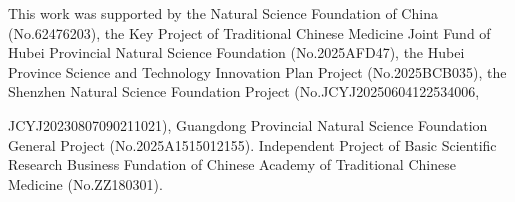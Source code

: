 \documentclass[journal,twoside,web]{ieeecolor}
\begin{document}
This work was supported by 
the Natural Science Foundation of China (No.62476203), 
the Key Project of Traditional Chinese Medicine Joint Fund of Hubei Provincial Natural Science Foundation (No.2025AFD47), 
the Hubei Province Science and Technology Innovation Plan Project (No.2025BCB035), 
the Shenzhen Natural Science Foundation Project (No.JCYJ20250604122534006, 

\noindent JCYJ20230807090211021), 
Guangdong Provincial Natural Science Foundation General Project (No.2025A1515012155). 
Independent Project of Basic Scientific Research Business Fundation of Chinese Academy of Traditional Chinese Medicine (No.ZZ180301).






\end{document}
